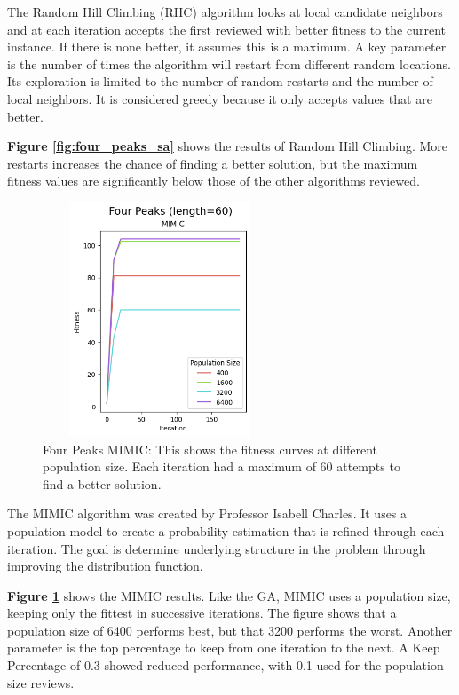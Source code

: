 \documentclass[letterpaper]{article} %
\begin{document}
The Random Hill Climbing (RHC) algorithm looks at local candidate neighbors and at each iteration accepts the first reviewed with better fitness to the current instance.  If there is none better, it assumes this is a maximum.   A key parameter is the number of times the algorithm will restart from different random locations.   Its exploration is limited to the number of random restarts and the number of local neighbors.  It is considered greedy because it only accepts values that are better.

\textbf{Figure \ref{fig:four_peaks_sa}}  shows the results of Random Hill Climbing.  More restarts increases the chance of finding a better solution, but the maximum fitness values are significantly below those of the other algorithms reviewed.

\begin{figure}[!htb]
\centering
\includegraphics[width=2.75in, height=2.75in]{figures/Four_Peaks_length=60_MIMIC_l_60_ma_60_p_400__1600__3200__6400_k_0.1_.png}
\caption{Four Peaks MIMIC:  This shows the fitness curves at different population size. Each iteration had a maximum of 60 attempts to find a better solution. }
\label{fig:four_peaks_mimic}
\end{figure}

The MIMIC algorithm was created by Professor Isabell Charles.  It uses a population model to create a probability estimation that is refined through each iteration.  The goal is determine underlying structure in the problem through improving the distribution function.

\textbf{Figure \ref{fig:four_peaks_mimic}} shows the MIMIC results.  Like the GA, MIMIC uses a population size, keeping only the fittest in successive iterations.  The figure shows that a population size of 6400 performs best, but that 3200 performs the worst.  Another parameter is the top percentage to keep from one iteration to the next.  A Keep Percentage of 0.3 showed reduced performance, with 0.1 used for the population size reviews. 
\end{document}
